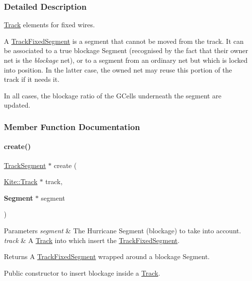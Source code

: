 \subsubsection{Detailed Description}
\mbox{\hyperlink{classKite_1_1Track}{Track}} elements for fixed wires. 

A \mbox{\hyperlink{classKite_1_1TrackFixedSegment}{Track\+Fixed\+Segment}} is a segment that cannot be moved from the track. It can be associated to a true blockage Segment (recognised by the fact that their owner net is the {\itshape blockage} net), or to a segment from an ordinary net but which is locked into position. In the latter case, the owned net may reuse this portion of the track if it needs it.

In all cases, the blockage ratio of the G\+Cells underneath the segment are updated. 

\subsubsection{Member Function Documentation}
\mbox{\label{classKite_1_1TrackFixedSegment_a7b548c2078a8d380b37ca12a96aa979d}} 
\paragraph{\texorpdfstring{create()}{create()}}
{\footnotesize\ttfamily \mbox{\hyperlink{classKite_1_1TrackSegment}{Track\+Segment}} $\ast$ create (\begin{DoxyParamCaption}\item[{\mbox{\hyperlink{classKite_1_1Track}{Kite\+::\+Track}} $\ast$}]{track,  }\item[{\textbf{ Segment} $\ast$}]{segment }\end{DoxyParamCaption})\hspace{0.3cm}{\ttfamily [static]}}


\begin{DoxyParams}{Parameters}
{\em segment} & The Hurricane Segment (blockage) to take into account. \\
\hline
{\em track} & A \mbox{\hyperlink{classKite_1_1Track}{Track}} into which insert the \mbox{\hyperlink{classKite_1_1TrackFixedSegment}{Track\+Fixed\+Segment}}. \\
\hline
\end{DoxyParams}
\begin{DoxyReturn}{Returns}
A \mbox{\hyperlink{classKite_1_1TrackFixedSegment}{Track\+Fixed\+Segment}} wrapped around a blockage Segment.
\end{DoxyReturn}
Public constructor to insert blockage inside a \mbox{\hyperlink{classKite_1_1Track}{Track}}. \mbox{\label{classKite_1_1TrackFixedSegment_a21b9cefd33ae22e4c2070ad441bdd30b}} 
